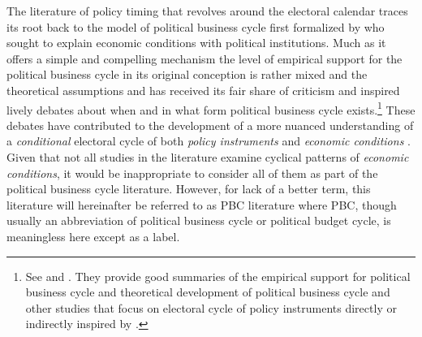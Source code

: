 \documentclass{article}
\begin{document}
		
		The literature of policy timing
		that revolves
		around
		the electoral calendar
		traces its root back to
		the model of political business cycle
		first formalized by
		\citeauthor{nordhausPoliticalBusinessCycle1975}
		\autocite*{nordhausPoliticalBusinessCycle1975}
		who
		sought to explain economic conditions
		with political institutions.
		Much as
		it offers a simple and compelling mechanism
		the level of empirical support for the
		political business cycle in its original conception
		is rather mixed and
		the theoretical assumptions
		and
		has received its fair share of criticism
		and inspired lively debates about
		when and in what form political business cycle exists.\footnote{
			See \citeauthor{duboisPoliticalBusinessCycles2016}
			\autocite*{duboisPoliticalBusinessCycles2016}
			and
			\citeauthor{altContextConditionalPolitical2009}
			\autocite*{altContextConditionalPolitical2009}.
			They provide good summaries
			of the empirical support for political business cycle
			and theoretical development of
			political business cycle and other
			studies that focus on electoral cycle of policy instruments
			directly or indirectly inspired by
			\citeauthor{nordhausPoliticalBusinessCycle1975}
			\autocite*{nordhausPoliticalBusinessCycle1975}.
		}
		These debates
		have contributed to the development of
		a more nuanced
		understanding of a \textit{conditional} electoral cycle
		of both \textit{policy instruments}
		and \textit{economic conditions}
		\autocite{altContextConditionalPolitical2009}.
		Given that not all studies in the literature
		examine cyclical patterns of \textit{economic conditions},
		it would be inappropriate to consider all of them as
		part of the political business cycle literature.
		However, for lack of a better term,
		this literature will hereinafter be referred to as PBC literature
		where PBC, though usually an abbreviation of political business cycle
		or political budget cycle,
		is meaningless here except as a label.
		
		
		
		
		
\end{document}
